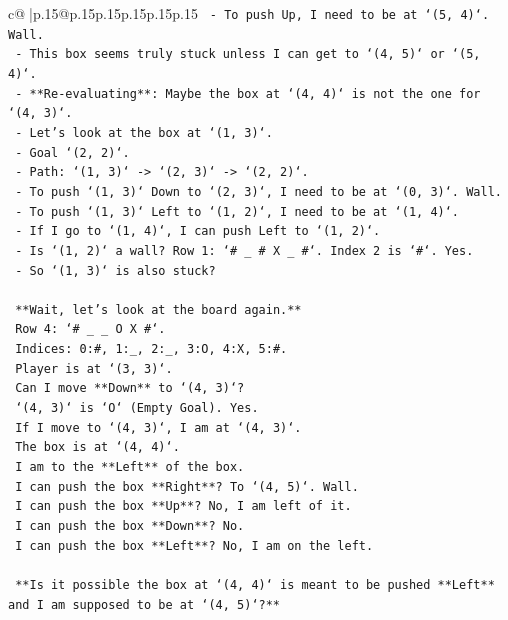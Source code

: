 \documentclass{article}
\begin{document}
{\begin{supertabular}{c@{$\;$}|p{.15\linewidth}@{}p{.15\linewidth}p{.15\linewidth}p{.15\linewidth}p{.15\linewidth}p{.15\linewidth}}
{{{\texttt{    {-}   To push Up, I need to be at `(5, 4)`. Wall.} \\
\texttt{    {-}   This box seems truly stuck unless I can get to `(4, 5)` or `(5, 4)`.} \\
\texttt{    {-}   **Re{-}evaluating**: Maybe the box at `(4, 4)` is not the one for `(4, 3)`.} \\
\texttt{    {-}   Let's look at the box at `(1, 3)`.} \\
\texttt{    {-}   Goal `(2, 2)`.} \\
\texttt{    {-}   Path: `(1, 3)` {-}> `(2, 3)` {-}> `(2, 2)`.} \\
\texttt{    {-}   To push `(1, 3)` Down to `(2, 3)`, I need to be at `(0, 3)`. Wall.} \\
\texttt{    {-}   To push `(1, 3)` Left to `(1, 2)`, I need to be at `(1, 4)`.} \\
\texttt{    {-}   If I go to `(1, 4)`, I can push Left to `(1, 2)`.} \\
\texttt{    {-}   Is `(1, 2)` a wall? Row 1: `\# \_ \# X \_ \#`. Index 2 is `\#`. Yes.} \\
\texttt{    {-}   So `(1, 3)` is also stuck?} \\
\\ 
\texttt{    **Wait, let's look at the board again.**} \\
\texttt{    Row 4: `\# \_ \_ O X \#`.} \\
\texttt{    Indices: 0:\#, 1:\_, 2:\_, 3:O, 4:X, 5:\#.} \\
\texttt{    Player is at `(3, 3)`.} \\
\texttt{    Can I move **Down** to `(4, 3)`?} \\
\texttt{    `(4, 3)` is `O` (Empty Goal). Yes.} \\
\texttt{    If I move to `(4, 3)`, I am at `(4, 3)`.} \\
\texttt{    The box is at `(4, 4)`.} \\
\texttt{    I am to the **Left** of the box.} \\
\texttt{    I can push the box **Right**? To `(4, 5)`. Wall.} \\
\texttt{    I can push the box **Up**? No, I am left of it.} \\
\texttt{    I can push the box **Down**? No.} \\
\texttt{    I can push the box **Left**? No, I am on the left.} \\
\\ 
\texttt{    **Is it possible the box at `(4, 4)` is meant to be pushed **Left** and I am supposed to be at `(4, 5)`?**} \\
}}}
\end{supertabular}}
\end{document}
